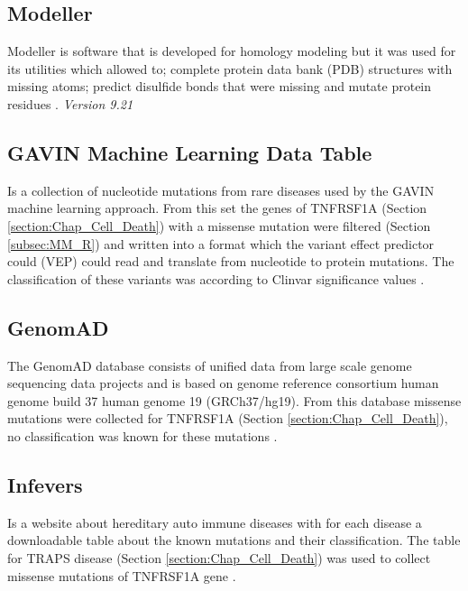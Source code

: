 \subsection{Modeller}
Modeller is software that is developed for homology modeling but it was used for its utilities which allowed to; complete protein data bank (PDB) structures with missing atoms; predict disulfide bonds that were missing and mutate protein residues \cite{}. 
\label{subsec:MM_Modeller}
\newline
\textit{Version 9.21}

\subsection{GAVIN Machine Learning Data Table}
Is a collection of nucleotide mutations from rare diseases used by the GAVIN \cite{} machine learning approach. From this set the genes of TNFRSF1A (Section \ref{section:Chap_Cell_Death}) with a missense mutation were filtered (Section \ref{subsec:MM_R}) and written into a format which the variant effect predictor could (VEP) \cite{} could read and translate from nucleotide to protein mutations. The classification of these variants was according to Clinvar significance values \cite{}. 
\label{subsec:MM_GAVIN_data_table}

\subsection{GenomAD}
The GenomAD database consists of unified data from large scale genome sequencing data projects and is based on genome reference consortium human genome build 37 human genome 19 (GRCh37/hg19). From this database missense mutations were collected for TNFRSF1A (Section \ref{section:Chap_Cell_Death}), no classification was known for these mutations \cite{}.
\label{subsec:MM_GnomAD}

\subsection{Infevers}
Is a website about hereditary auto immune diseases with for each disease a downloadable table about the known mutations and their classification. The table for TRAPS disease (Section \ref{section:Chap_Cell_Death}) was used to collect missense mutations of TNFRSF1A gene \cite{}.
\label{subsec:MM_Infevers}

